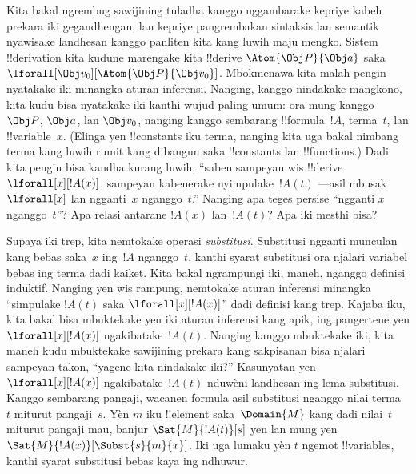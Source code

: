 \documentclass[../../../include/open-logic-section]{subfiles}
\begin{document}


Kita bakal ngrembug sawijining tuladha kanggo nggambarake kepriye kabeh
prekara iki gegandhengan, lan kepriye pangrembakan sintaksis lan
semantik nyawisake landhesan kanggo panliten kita kang luwih maju
mengko. Sistem !!{derivation} kita kudune marengake kita !!{derive}
$\Atom{\Obj P}{\Obj a}$ saka $\lforall[\Obj
v_0][\Atom{\Obj P}{\Obj v_0}]$. Mbokmenawa kita malah
pengin nyatakake iki minangka aturan inferensi. Nanging, kanggo
nindakake mangkono, kita kudu bisa nyatakake iki kanthi wujud paling
umum: ora mung kanggo $\Obj P$, $\Obj a$, lan $\Obj v_0$, nanging
kanggo sembarang !!{formula}~$!A$, terma~$t$, lan !!{variable}~$x$.
(Elinga yen !!{constant}s iku terma, nanging kita uga bakal nimbang terma
kang luwih rumit kang dibangun saka !!{constant}s lan !!{function}s.)
Dadi kita pengin bisa kandha kurang luwih, ``saben sampeyan wis
!!{derive} $\lforall[x][!A(x)]$, sampeyan kabenerake nyimpulake~$!A(t)$
---asil mbusak $\lforall[x]$ lan ngganti~$x$ nganggo~$t$.'' Nanging apa
teges persise ``ngganti $x$ nganggo~$t$''? Apa relasi antarane $!A(x)$
lan~$!A(t)$? Apa iki mesthi bisa?

Supaya iki trep, kita nemtokake operasi \emph{substitusi}.
Substitusi ngganti munculan kang bebas saka~$x$ ing~$!A$
nganggo~$t$, kanthi syarat substitusi ora njalari variabel bebas ing terma dadi kaiket.
Kita bakal ngrampungi iki, maneh, nganggo definisi
induktif. Nanging yen wis rampung, nemtokake aturan inferensi minangka
``simpulake $!A(t)$ saka $\lforall[x][!A(x)]$'' dadi definisi kang
trep. Kajaba iku, kita bakal bisa mbuktekake yen iki aturan inferensi
kang apik, ing pangertene yen $\lforall[x][!A(x)]$ ngakibatake~$!A(t)$.
Nanging kanggo mbuktekake iki, kita maneh kudu mbuktekake sawijining
prekara kang sakpisanan bisa njalari sampeyan takon, ``yagene kita
nindakake iki?'' Kasunyatan yen $\lforall[x][!A(x)]$ ngakibatake~$!A(t)$
nduwèni landhesan ing lema substitusi. Kanggo sembarang pangaji,
wacanen formula asil substitusi nganggo nilai terma~$t$ miturut pangaji~$s$. Yèn $m$
iku !!{element} saka~$\Domain{M}$ kang dadi nilai~$t$ miturut pangaji
mau, banjur $\Sat{M}{!A(t)}[s]$ yen lan mung yen
$\Sat{M}{!A(x)}[\Subst{s}{m}{x}]$. Iki uga lumaku yèn $t$ ngemot
!!{variable}s, kanthi syarat substitusi bebas kaya ing ndhuwur.
\end{document}

